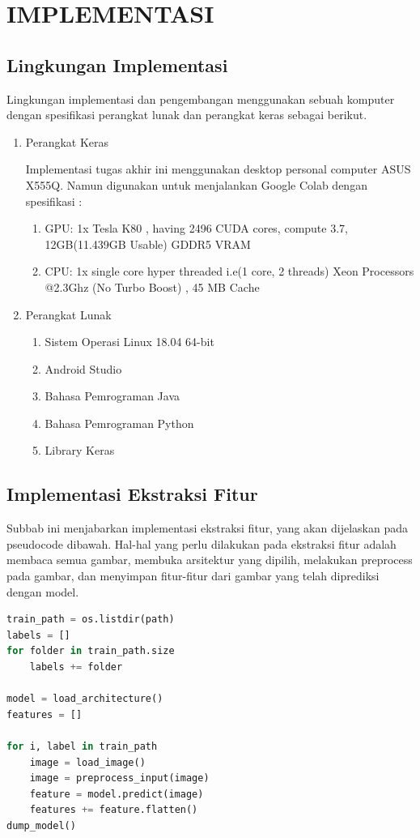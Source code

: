 \chapter {IMPLEMENTASI}

\section{Lingkungan Implementasi}

Lingkungan implementasi dan pengembangan menggunakan sebuah komputer dengan spesifikasi perangkat lunak dan perangkat keras sebagai berikut.

\begin{enumerate}
	\item Perangkat Keras
	\par Implementasi tugas akhir ini menggunakan desktop personal computer ASUS X555Q. Namun digunakan untuk menjalankan Google Colab dengan spesifikasi :
	\begin{enumerate}
		\item GPU: 1x Tesla K80 , having 2496 CUDA cores, compute 3.7, 12GB(11.439GB Usable) GDDR5 VRAM
		\item CPU: 1x single core hyper threaded i.e(1 core, 2 threads) Xeon Processors @2.3Ghz (No Turbo Boost) , 45 MB Cache
	\end{enumerate}
	\item Perangkat Lunak
	\begin{enumerate}
		\item Sistem Operasi Linux 18.04 64-bit
		\item Android Studio
		\item Bahasa Pemrograman Java
		\item Bahasa Pemrograman Python
		\item Library Keras
	\end{enumerate}
\end{enumerate}


\section{Implementasi Ekstraksi Fitur}
Subbab ini menjabarkan implementasi ekstraksi fitur, yang akan dijelaskan pada pseudocode dibawah. Hal-hal yang perlu dilakukan pada ekstraksi fitur adalah membaca semua gambar, membuka arsitektur yang dipilih, melakukan preprocess pada gambar, dan menyimpan fitur-fitur dari gambar yang telah diprediksi dengan model.
\begin{lstlisting}[language=python, caption=Pseudocode implementasi ekstraksi fitur, label=code:read_h5, firstnumber=1]
train_path = os.listdir(path)
labels = []
for folder in train_path.size
	labels += folder
	
model = load_architecture()
features = []

for i, label in train_path
	image = load_image()
	image = preprocess_input(image)
	feature = model.predict(image)
	features += feature.flatten()
dump_model()
\end{lstlisting}

